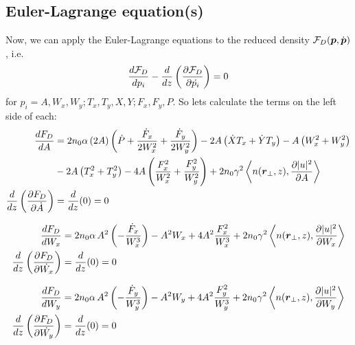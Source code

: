 \subsection{Euler-Lagrange equation(s)}
Now, we can apply the Euler-Lagrange equations to the reduced density $\mathcal{F}_{D}(\mbox{\boldmath{$p$}},\dot{\mbox{\boldmath{$p$}}})$, i.e.
\begin{equation}
\begin{split}
    \frac{d{\mathcal{F}_{D}}}{d{p_i}}  - \frac{d{}}{d{z}}\left(\frac{\partial \mathcal{F}_{D}}{\partial \dot{p_i}}\right) = 0 
\end{split}
\end{equation}
for $p_i = A, W_x,W_y; T_x, T_y, X, Y; F_x,F_y, P$.
So lets calculate the terms on the left side of each:
\begin{equation}
\begin{split}
    \frac{d{F_{D}}}{d{A}}  &=  2 n_0 \alpha\, (2A) \left(\dot{P}  + \frac{\dot{F}_{x} }{2W_{x}^2} + \frac{\dot{F}_{y}}{2W_{y}^2} \right) - 2A  \left(\dot{X}T_x + \dot{Y} T_y\right)  - A  \left(W_x^2+ W_y^2\right) \\
        &- 2A  \left(T_x^2 + T_y^2 \right) - 4A  \left(\frac{F_{x}^2}{W_{x}^2} + \frac{F_{y}^2}{W_{y}^2}\right) +  2n_0 \gamma^2 \left< n(\mbox{\boldmath{$r$}}_{\perp},z),\frac{\partial |u|^2}{\partial A}\right>\\
    \frac{d{}}{d{z}}\left(\frac{\partial F_{D}}{\partial \dot{A}}\right) &= \frac{d{}}{d{z}}(0) = 0 \\
\end{split}
\end{equation}

\begin{equation}
\begin{split}
    \frac{d{F_{D}}}{d{W_x}} & = 2 n_0 \alpha\, A^2 \left(  -\frac{\dot{F}_{x} }{W_{x}^3} \right)  - A^2 W_x + 4 A^2 \frac{F_{x}^2}{W_{x}^3}  + 2n_0 \gamma^2 \left<n(\mbox{\boldmath{$r$}}_{\perp},z), \frac{\partial |u|^2}{\partial W_{x}}\right>\\
\frac{d{}}{d{z}}\left(\frac{\partial F_{D}}{\partial \dot{W_x}}\right) &= \frac{d{}}{d{z}}(0) = 0 
\end{split}
\end{equation}

\begin{equation}
\begin{split}
    \frac{d{F_{D}}}{d{W_y}} & = 2 n_0 \alpha\, A^2 \left(  -\frac{\dot{F}_{y} }{W_{y}^3} \right)  - A^2 W_y + 4 A^2 \frac{F_{y}^2}{W_{y}^3}  + 2n_0 \gamma^2 \left<n(\mbox{\boldmath{$r$}}_{\perp},z), \frac{\partial |u|^2}{\partial W_{y}}\right>\\
\frac{d{}}{d{z}}\left(\frac{\partial F_{D}}{\partial \dot{W_y}}\right) &= \frac{d{}}{d{z}}(0) = 0 
\end{split}
\end{equation}

